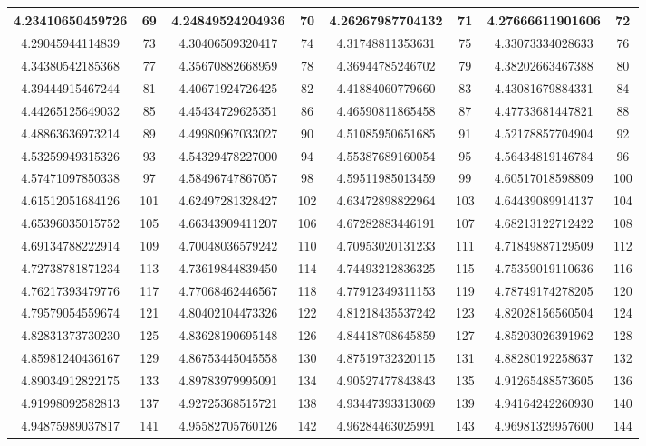 \documentclass{exam}
\begin{document}
\begin{figure}
\begin{tabular}{|c|c||c|c||c|c||c|c|}
\hline
4.23410650459726 & 69 &4.24849524204936 & 70 &4.26267987704132 & 71 &4.27666611901606 & 72 \\
\hline
4.29045944114839 & 73 &4.30406509320417 & 74 &4.31748811353631 & 75 &4.33073334028633 & 76 \\
\hline
4.34380542185368 & 77 &4.35670882668959 & 78 &4.36944785246702 & 79 &4.38202663467388 & 80 \\
\hline
4.39444915467244 & 81 &4.40671924726425 & 82 &4.41884060779660 & 83 &4.43081679884331 & 84 \\
\hline
4.44265125649032 & 85 &4.45434729625351 & 86 &4.46590811865458 & 87 &4.47733681447821 & 88 \\
\hline
4.48863636973214 & 89 &4.49980967033027 & 90 &4.51085950651685 & 91 &4.52178857704904 & 92 \\
\hline
4.53259949315326 & 93 &4.54329478227000 & 94 &4.55387689160054 & 95 &4.56434819146784 & 96 \\
\hline
4.57471097850338 & 97 &4.58496747867057 & 98 &4.59511985013459 & 99 &4.60517018598809 & 100 \\
\hline
4.61512051684126 & 101 &4.62497281328427 & 102 &4.63472898822964 & 103 &4.64439089914137 & 104 \\
\hline
4.65396035015752 & 105 &4.66343909411207 & 106 &4.67282883446191 & 107 &4.68213122712422 & 108 \\
\hline
4.69134788222914 & 109 &4.70048036579242 & 110 &4.70953020131233 & 111 &4.71849887129509 & 112 \\
\hline
4.72738781871234 & 113 &4.73619844839450 & 114 &4.74493212836325 & 115 &4.75359019110636 & 116 \\
\hline
4.76217393479776 & 117 &4.77068462446567 & 118 &4.77912349311153 & 119 &4.78749174278205 & 120 \\
\hline
4.79579054559674 & 121 &4.80402104473326 & 122 &4.81218435537242 & 123 &4.82028156560504 & 124 \\
\hline
4.82831373730230 & 125 &4.83628190695148 & 126 &4.84418708645859 & 127 &4.85203026391962 & 128 \\
\hline
4.85981240436167 & 129 &4.86753445045558 & 130 &4.87519732320115 & 131 &4.88280192258637 & 132 \\
\hline
4.89034912822175 & 133 &4.89783979995091 & 134 &4.90527477843843 & 135 &4.91265488573605 & 136 \\
\hline
4.91998092582813 & 137 &4.92725368515721 & 138 &4.93447393313069 & 139 &4.94164242260930 & 140 \\
\hline
4.94875989037817 & 141 &4.95582705760126 & 142 &4.96284463025991 & 143 &4.96981329957600 & 144 \\

\end{tabular}
\end{figure}
\end{document}

